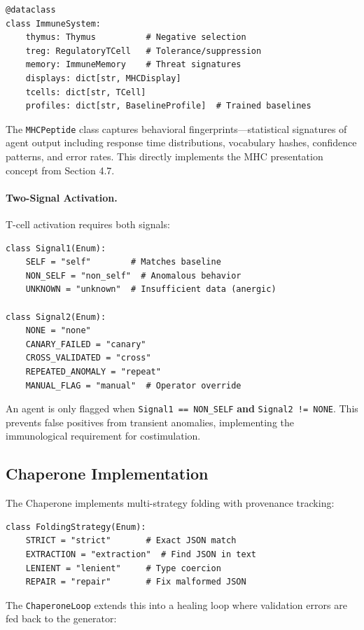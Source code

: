 \begin{verbatim}
@dataclass
class ImmuneSystem:
    thymus: Thymus          # Negative selection
    treg: RegulatoryTCell   # Tolerance/suppression
    memory: ImmuneMemory    # Threat signatures
    displays: dict[str, MHCDisplay]
    tcells: dict[str, TCell]
    profiles: dict[str, BaselineProfile]  # Trained baselines
\end{verbatim}

The \texttt{MHCPeptide} class captures behavioral fingerprints---statistical signatures of agent output
including response time distributions, vocabulary hashes, confidence patterns, and error rates. This
directly implements the MHC presentation concept from Section 4.7.

\paragraph{Two-Signal Activation.}
T-cell activation requires both signals:
\begin{verbatim}
class Signal1(Enum):
    SELF = "self"        # Matches baseline
    NON_SELF = "non_self"  # Anomalous behavior
    UNKNOWN = "unknown"  # Insufficient data (anergic)

class Signal2(Enum):
    NONE = "none"
    CANARY_FAILED = "canary"
    CROSS_VALIDATED = "cross"
    REPEATED_ANOMALY = "repeat"
    MANUAL_FLAG = "manual"  # Operator override
\end{verbatim}

An agent is only flagged when \texttt{Signal1 == NON\_SELF} \textbf{and} \texttt{Signal2 != NONE}.
This prevents false positives from transient anomalies, implementing the immunological requirement
for costimulation.

\subsection{Chaperone Implementation}

The Chaperone implements multi-strategy folding with provenance tracking:

\begin{verbatim}
class FoldingStrategy(Enum):
    STRICT = "strict"       # Exact JSON match
    EXTRACTION = "extraction"  # Find JSON in text
    LENIENT = "lenient"     # Type coercion
    REPAIR = "repair"       # Fix malformed JSON
\end{verbatim}

The \texttt{ChaperoneLoop} extends this into a healing loop where validation errors are fed back
to the generator:

